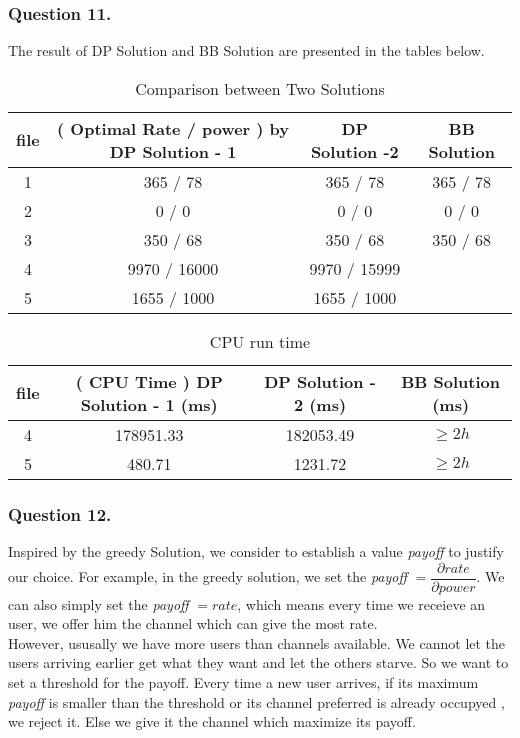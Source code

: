 \documentclass[11pt, oneside]{report}
\begin{document}
\subsubsection{Question 11. }

The result of DP Solution and BB Solution are presented in the tables below.

\begin{table}[!htbp]
\centering
\begin{tabular}{|c|c|c|c|}%
\hline
file & ( Optimal Rate / power ) by DP Solution - 1 & DP Solution -2 &   BB Solution \\
\hline
1 & 365 / 78  & 365 / 78 & 365 / 78 \\
\hline
2 & 0 / 0 & 0 / 0 & 0 / 0\\
\hline
3 & 350 / 68 & 350 / 68 & 350 / 68 \\
\hline
4 & 9970 / 16000 & 9970 / 15999 & \\
\hline
5 & 1655 / 1000 & 1655 / 1000 & \\
\hline
\end{tabular}
\caption{Comparison between Two Solutions}
\end{table}

\begin{table}[!htbp]
\centering
\begin{tabular}{|c|c|c|c|}%
\hline
file & ( CPU Time ) DP Solution - 1 (ms) & DP Solution - 2 (ms) & BB Solution (ms) \\
\hline
4 &  178951.33 & 182053.49 & $\ge 2h$ \\
\hline
5 & 480.71 & 1231.72 & $\ge 2h$\\
\hline
\end{tabular}
\caption{CPU run time}
\end{table}

\subsubsection{Question 12. }
Inspired by the greedy Solution, we consider to establish a value \textit{payoff} to justify our choice. For example, in the greedy solution, we set the \textit{payoff} $ = \dfrac{\partial rate}{\partial power}$. We can also simply set the \textit{payoff} $ = rate$, which means every time we receieve an user, we offer him the channel which can give the most rate. \\

However, ususally we have more users than channels available. We cannot let the users arriving earlier get what they want and let the others starve. So we want to set a threshold for the payoff. Every time a new user arrives, if its maximum \textit{payoff} is smaller than the threshold or its channel preferred is already occupyed , we reject it. Else we give it the channel which maximize its payoff. \\
\end{document}
